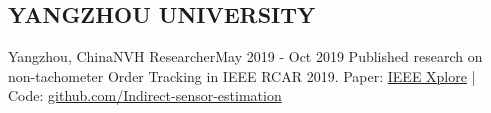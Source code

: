 \subsection{YANGZHOU UNIVERSITY}{Yangzhou, China}{NVH Researcher}{May 2019 - Oct 2019}
Published research on non-tachometer Order Tracking in IEEE RCAR 2019. 
Paper: \href{https://ieeexplore.ieee.org/abstract/document/9044105}{\small IEEE Xplore} | 
Code: \href{https://github.com/zhutoutoutousan/Indirect-sensor-estimation}{\small github.com/Indirect-sensor-estimation}
